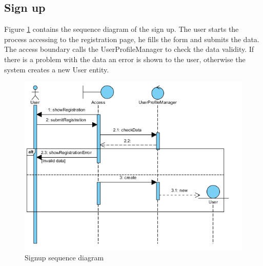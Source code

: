 \documentclass[10pt,a4paper,titlepage]{article}
\begin{document}
\subsection{Sign up}
Figure \ref{fig:signup_sequence} contains the sequence diagram of the sign up. The user starts the process accessing to the registration page, he fills the form and submits the data. The access boundary calls the UserProfileManager to check the data validity. If there is a problem with the data an error is shown to the user, otherwise the system creates a new User entity.
\begin{figure}[h!]
\centering
\includegraphics[width=\linewidth]{./images/signup_sequence}
\caption[Signup sequence]{Signup sequence diagram}
\label{fig:signup_sequence}
\end{figure}

\clearpage
\end{document}
